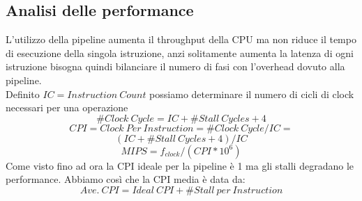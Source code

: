 \subsection{Analisi delle performance}
L'utilizzo della pipeline aumenta il throughput della CPU ma non riduce il tempo di esecuzione della singola istruzione, anzi solitamente aumenta la latenza di ogni istruzione bisogna quindi bilanciare il numero di fasi con l'overhead dovuto alla pipeline.\\
Definito $IC = Instruction \ Count$ possiamo determinare il numero di cicli di clock necessari per una operazione
$$\#Clock \ Cycle = IC + \# Stall \ Cycles + 4$$
$$CPI= Clock \ Per \ Instruction = \# Clock \ Cycle / IC = $$
$$(IC + \#Stall \ Cycles + 4)/IC$$
$$MIPS= f_{clock} / (CPI * 10^6)$$
Come visto fino ad ora la CPI ideale per la pipeline è 1 ma gli stalli degradano le performance.
Abbiamo così che la CPI media è data da:
$$Ave. \ CPI = Ideal \ CPI + \#Stall \ per \ Instruction$$
